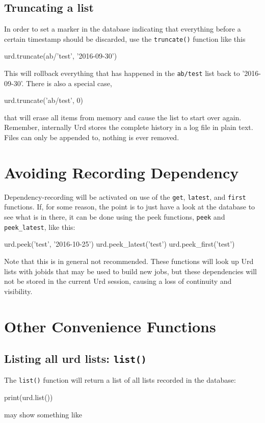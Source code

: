 \subsection{Truncating a list}
In order to set a marker in the database indicating that everything
before a certain timestamp should be discarded, use
the \texttt{truncate()} function like this
\begin{python}
urd.truncate(ab/'test', '2016-09-30')
\end{python}
This will rollback everything that has happened in
the \texttt{ab/test} list back to '2016-09-30'.  There is also a
special case,
\begin{python}
urd.truncate('ab/test', 0)
\end{python}
that will erase all items from memory and cause the list to start over
again.  Remember, internally Urd stores the complete history in a log
file in plain text.  Files can only be appended to, nothing is ever
removed.




\section{Avoiding Recording Dependency}
Dependency-recording will be activated on use of the \texttt{get},
\texttt{latest}, and \texttt{first} functions.  If, for some reason,
the point is to just have a look at the database to see what is in
there, it can be done using the peek functions, \texttt{peek} and
\texttt{peek\_latest}, like this:
\begin{python}
urd.peek('test', '2016-10-25')
urd.peek_latest('test')
urd.peek_first('test')
\end{python}
Note that this is in general not recommended.  These functions will
look up Urd lists with jobids that may be used to build new jobs, but
these dependencies will not be stored in the current Urd session,
causing a loss of continuity and visibility.



\section{Other Convenience Functions}
\subsection{Listing all urd lists:  \texttt{list()}}
The \texttt{list()} function will return a list of all lists recorded in
the database:
\begin{python}
print(urd.list())
\end{python}
may show something like
\begin{shell}
\end{shell}




